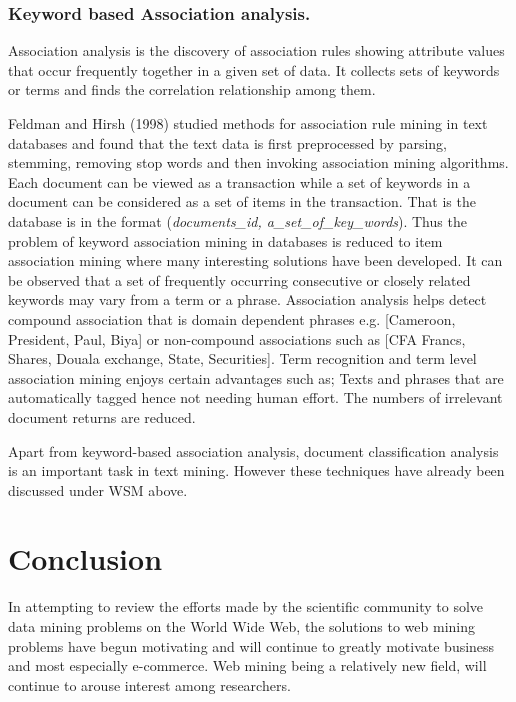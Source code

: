 \documentclass{article}
\begin{document}
\subsubsection{Keyword based Association analysis.}
Association analysis is the discovery of association rules showing attribute values that occur frequently together in a given set of data. It collects sets of keywords or terms and finds the correlation relationship among them. 
 
Feldman and Hirsh (1998) studied methods for association rule mining in text databases and found that the text data is first preprocessed by parsing, stemming, removing stop words and then invoking association mining algorithms. Each document can be viewed as a transaction while a set of keywords in a document can be considered as a set of items in the transaction. That is the database is in the format (\textit{documents\_id, a\_set\_of\_key\_words}). Thus the problem of keyword association mining in databases is reduced to item association mining where many interesting solutions have been developed.
It can be observed that a set of frequently occurring consecutive or closely related keywords may vary from a term or a phrase. Association analysis helps detect compound association that is domain dependent phrases e.g. [Cameroon, President, Paul, Biya] or non-compound associations such as [CFA Francs, Shares, Douala exchange, State, Securities]. Term recognition and term level association mining enjoys certain advantages such as;
 \newline Texts and phrases that are automatically tagged hence not needing human effort.
\newline The numbers of irrelevant document returns are reduced.

Apart from keyword-based association analysis, document classification analysis is an important task in text mining. However these techniques have already been discussed under WSM above.
\pagebreak
\section{Conclusion}
In attempting to review the efforts made by the scientific community to solve data mining problems on the World Wide Web, the solutions to web mining problems have begun motivating and will continue to greatly motivate business and most especially e-commerce. Web mining being a relatively new field, will continue to arouse interest among researchers.
\pagebreak
\end{document}
